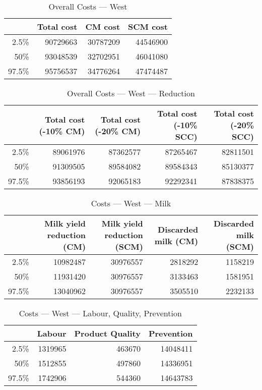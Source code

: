 \documentclass{article}\usepackage[]{graphicx}\usepackage[]{color}
\begin{document}
\begin{table}[ht]
\centering
\begin{tabular}{rrrr}
  \hline
 & Total cost & CM cost & SCM cost \\ 
  \hline
2.5\% & 90729663 & 30787209 & 44546900 \\ 
  50\% & 93048539 & 32702951 & 46041080 \\ 
  97.5\% & 95756537 & 34776264 & 47474487 \\ 
   \hline
\end{tabular}
\caption{Overall Costs --- West} 
\label{tab:west:overall}
\end{table}
\begin{table}[ht]
\centering
\begin{tabular}{rrrrr}
  \hline
 & Total cost (-10\% CM) & Total cost (-20\% CM) & Total cost (-10\% SCC) & Total cost (-20\% SCC) \\ 
  \hline
2.5\% & 89061976 & 87362577 & 87265467 & 82811501 \\ 
  50\% & 91309505 & 89584082 & 89584343 & 85130377 \\ 
  97.5\% & 93856193 & 92065183 & 92292341 & 87838375 \\ 
   \hline
\end{tabular}
\caption{Overall Costs --- West --- Reduction} 
\label{tab:west:reduction}
\end{table}
\begin{table}[ht]
\centering
\begin{tabular}{rrrrr}
  \hline
 & Milk yield reduction (CM) & Milk yield reduction (SCM) & Discarded milk (CM) & Discarded milk (SCM) \\ 
  \hline
2.5\% & 10982487 & 30976557 & 2818292 & 1158219 \\ 
  50\% & 11931420 & 30976557 & 3133463 & 1581951 \\ 
  97.5\% & 13040962 & 30976557 & 3505510 & 2232133 \\ 
   \hline
\end{tabular}
\caption{Costs --- West --- Milk} 
\label{tab:west:a}
\end{table}
\begin{table}[ht]
\centering
\begin{tabular}{rrrr}
  \hline
 & Labour & Product Quality & Prevention \\ 
  \hline
2.5\% & 1319965 & 463670 & 14048411 \\ 
  50\% & 1512855 & 497860 & 14336951 \\ 
  97.5\% & 1742906 & 544360 & 14643783 \\ 
   \hline
\end{tabular}
\caption{Costs --- West --- Labour, Quality, Prevention} 
\label{tab:west:b}
\end{table}
\end{document}
